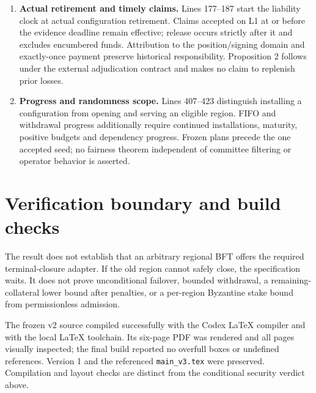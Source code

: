 \documentclass[11pt,a4paper]{article}
\begin{document}
\begin{enumerate}[leftmargin=*,itemsep=7pt]
\item \textbf{Actual retirement and timely claims.}
Lines 177--187 start the liability clock at actual configuration retirement.
Claims accepted on L1 at or before the evidence deadline remain effective;
release occurs strictly after it and excludes encumbered funds.
Attribution to the position/signing domain and exactly-once payment
preserve historical responsibility. Proposition 2 follows under the
external adjudication contract and makes no claim to replenish prior losses.

\item \textbf{Progress and randomness scope.}
Lines 407--423 distinguish installing a configuration from opening and
serving an eligible region. FIFO and withdrawal progress additionally
require continued installations, maturity, positive budgets and dependency
progress. Frozen plans precede the one accepted seed; no fairness theorem
independent of committee filtering or operator behavior is asserted.
\end{enumerate}

\section*{Verification boundary and build checks}
The result does not establish that an arbitrary regional BFT offers the
required terminal-closure adapter. If the old region cannot safely close,
the specification waits. It does not prove unconditional failover, bounded
withdrawal, a remaining-collateral lower bound after penalties, or a
per-region Byzantine stake bound from permissionless admission.

The frozen v2 source compiled successfully with the Codex LaTeX compiler
and with the local LaTeX toolchain. Its six-page PDF was rendered and all
pages visually inspected; the final build reported no overfull boxes or
undefined references. Version 1 and the referenced \texttt{main\_v3.tex}
were preserved. Compilation and layout checks are distinct from the
conditional security verdict above.
\end{document}
